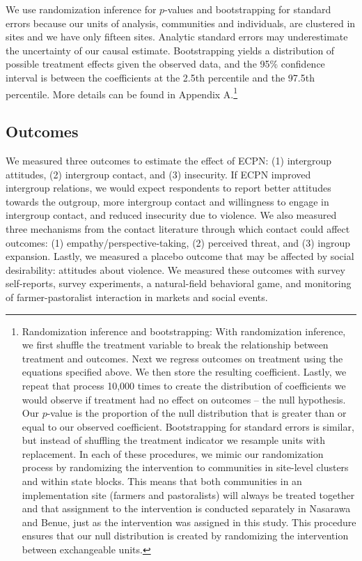 \documentclass[11pt]{article}
\begin{document}
We use randomization inference for \(p\)-values and bootstrapping for
standard errors because our units of analysis, communities and
individuals, are clustered in sites and we have only fifteen sites.
Analytic standard errors may underestimate the uncertainty of our causal
estimate. Bootstrapping yields a distribution of possible treatment
effects given the observed data, and the 95\% confidence interval is
between the coefficients at the 2.5th percentile and the 97.5th
percentile. More details can be found in Appendix A.\footnote{Randomization
  inference and bootstrapping: With randomization inference, we first
  shuffle the treatment variable to break the relationship between
  treatment and outcomes. Next we regress outcomes on treatment using
  the equations specified above. We then store the resulting
  coefficient. Lastly, we repeat that process 10,000 times to create the
  distribution of coefficients we would observe if treatment had no
  effect on outcomes -- the null hypothesis. Our \(p\)-value is the
  proportion of the null distribution that is greater than or equal to
  our observed coefficient. Bootstrapping for standard errors is
  similar, but instead of shuffling the treatment indicator we resample
  units with replacement. In each of these procedures, we mimic our
  randomization process by randomizing the intervention to communities
  in site-level clusters and within state blocks. This means that both
  communities in an implementation site (farmers and pastoralists) will
  always be treated together and that assignment to the intervention is
  conducted separately in Nasarawa and Benue, just as the intervention
  was assigned in this study. This procedure ensures that our null
  distribution is created by randomizing the intervention between
  exchangeable units.}

\hypertarget{outcomes}{%
\subsection{Outcomes}\label{outcomes}}

We measured three outcomes to estimate the effect of ECPN: (1)
intergroup attitudes, (2) intergroup contact, and (3) insecurity. If
ECPN improved intergroup relations, we would expect respondents to
report better attitudes towards the outgroup, more intergroup contact
and willingness to engage in intergroup contact, and reduced insecurity
due to violence. We also measured three mechanisms from the contact
literature through which contact could affect outcomes: (1)
empathy/perspective-taking, (2) perceived threat, and (3) ingroup
expansion. Lastly, we measured a placebo outcome that may be affected by
social desirability: attitudes about violence. We measured these
outcomes with survey self-reports, survey experiments, a natural-field
behavioral game, and monitoring of farmer-pastoralist interaction in
markets and social events.
\end{document}

